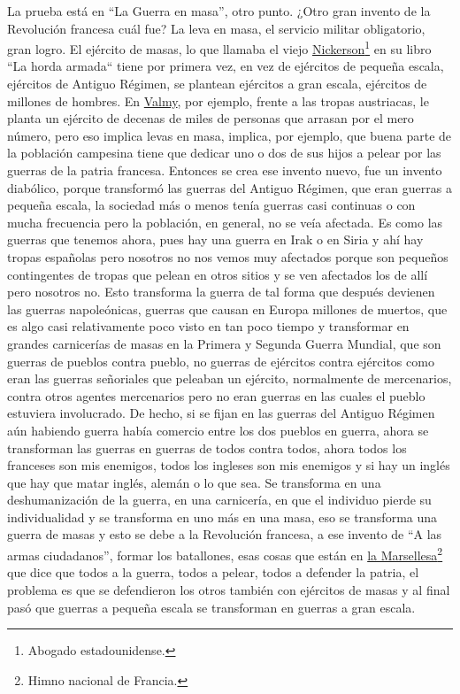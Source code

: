 La prueba está en \enquote{La Guerra en masa}, otro punto. ¿Otro gran invento de la Revolución francesa cuál fue? La leva en masa, el servicio militar obligatorio, gran logro. El ejército de masas, lo que llamaba el viejo \href{https://en.wikipedia.org/wiki/Eugene_Nickerson}{Nickerson}\footnote{Abogado estadounidense.} en su libro ``La horda armada``\citep{nickerson1940armed} tiene por primera vez, en vez de ejércitos de pequeña escala, ejércitos de Antiguo Régimen, se plantean ejércitos a gran escala, ejércitos de millones de hombres. En \href{https://en.wikipedia.org/wiki/Battle_of_Valmy}{Valmy}, por ejemplo, frente a las tropas austriacas, le planta un ejército de decenas de miles de personas que arrasan por el mero número, pero eso implica levas en masa, implica, por ejemplo, que buena parte de la población campesina tiene que dedicar uno o dos de sus hijos a pelear por las guerras de la patria francesa. Entonces se crea ese invento nuevo, fue un invento diabólico, porque transformó las guerras del Antiguo Régimen, que eran guerras a pequeña escala, la sociedad más o menos tenía guerras casi continuas o con mucha frecuencia pero la población, en general, no se veía afectada. Es como las guerras que tenemos ahora, pues hay una guerra en Irak o en Siria y ahí hay tropas españolas pero nosotros no nos vemos muy afectados porque son pequeños contingentes de tropas que pelean en otros sitios y se ven afectados los de allí pero nosotros no. Esto transforma la guerra de tal forma que después devienen las guerras napoleónicas, guerras que causan en Europa millones de muertos, que es algo casi relativamente poco visto en tan poco tiempo y transformar en grandes carnicerías de masas en la Primera y Segunda Guerra Mundial, que son guerras de pueblos contra pueblo, no guerras de ejércitos contra ejércitos como eran las guerras señoriales que peleaban un ejército, normalmente de mercenarios, contra otros agentes mercenarios pero no eran guerras en las cuales el pueblo estuviera involucrado. De hecho, si se fijan en las guerras del Antiguo Régimen aún habiendo guerra había comercio entre los dos pueblos en guerra, ahora se transforman las guerras en guerras de todos contra todos, ahora todos los franceses son mis enemigos, todos los ingleses son mis enemigos y si hay un inglés que hay que matar inglés, alemán o lo que sea. Se transforma en una deshumanización de la guerra, en una carnicería, en que el individuo pierde su individualidad y se transforma en uno más en una masa, eso se transforma una guerra de masas y esto se debe a la Revolución francesa, a ese invento de \enquote{A las armas ciudadanos}, formar los batallones, esas cosas que están en \href{https://en.wikipedia.org/wiki/La_Marseillaise}{la Marsellesa}\footnote{Himno nacional de Francia.} que dice que todos a la guerra, todos a pelear, todos a defender la patria, el problema es que se defendieron los otros también con ejércitos de masas y al final pasó que guerras a pequeña escala se transforman en guerras a gran escala.

